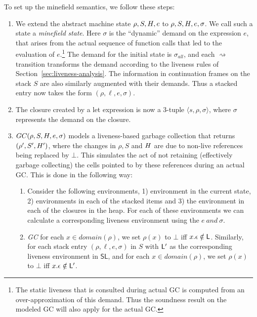 \documentclass[9pt]{sigplanconf}
\begin{document}
\noindent To set up the minefield semantics, we follow these steps:
\begin{enumerate}

\item  We  extend  the  abstract  machine  state  $\rho,S,H,e$  to
  $\rho,S,H,e,\sigma$.   We call  such a  state a  \emph{minefield
  state}.  Here $\sigma$  is the ``dynamic'' demand  on the expression
  $e$, that arises from the actual sequence of function calls that led
  to  the  evaluation of  $e$.\footnote{The  static  liveness that  is
    consulted during actual GC  is computed from an over-approximation
    of this demand.  Thus the soundness  result on the modeled GC will
    also apply for the actual GC.} The demand for the initial state is
  $\sigma_{\mathit  {all}}$,  and each  $\rightsquigarrow$  transition
  transforms   the  demand   according  to   the  liveness   rules  of
  Section~\ref{sec:liveness-analysis}.      The     information     in
  continuation frames  on the stack  $S$ are also  similarly augmented
  with their demands.  Thus a stacked entry now takes the form $(\rho,
  \ell, e, \sigma)$.

\item The closure created by a let expression is now a 3-tuple
  $\langle s,  \rho, \sigma \rangle$, where $\sigma$ represents the
  demand on the closure. 

\item  $GC(\rho,  S,  H,  e, \sigma)$ models  a  liveness-based  garbage
  collection that returns $(\rho', S', H')$, where the changes in
  $\rho, S$ and  $H$ are due
  to non-live references being replaced by $\bot$.  This simulates the
  act of  not retaining  (effectively garbage collecting)  the cells
  pointed to by these references  during an actual GC.
  This is done in the following way:
  \begin{enumerate} 
 \item Consider the following environments, 1) environment in the
   current state, 2) environments in each of the stacked items and 3)
   the environment in each of the closures in the heap. For each of
   these environments we can calculate a corresponding liveness environment
   using the  $e\ and\ \sigma$. 
\item \emph{GC}
   for each $x \in
    domain(\rho)$, we  set $\rho(x)$ to $\bot$  iff $x.\epsilon \notin
    \mathsf{L}$.  Similarly,  for each  stack entry $(\rho,\ell,e,\sigma)$
    in $S$ 
    with  $\mathsf{L}'$   as  the   corresponding  liveness   environment  in
    $\mathsf{SL}$, and for each $x \in domain(\rho)$, we set $\rho(x)$
    to $\bot$ iff $x.\epsilon \notin \mathsf{L}'$.


\end{enumerate}
\end{enumerate}
\end{document}
